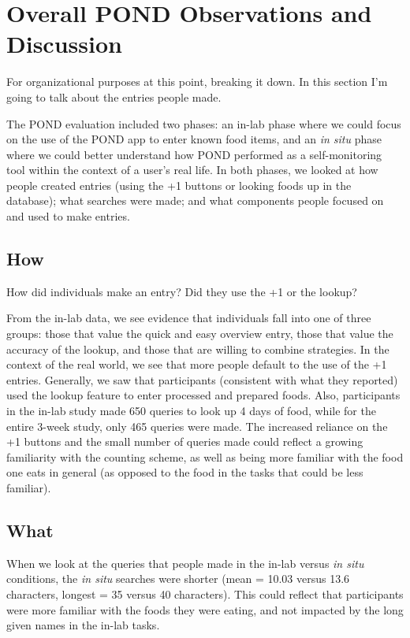 \section{Overall POND Observations and Discussion}
For organizational purposes at this point, breaking it down. In this section I'm going to talk about the entries people made. 

The POND evaluation included two phases: an in-lab phase where we could focus on the use of the POND app to enter known food items, and an \textit{in situ} phase where we could better understand how POND performed as a self-monitoring tool within the context of a user's real life. In both phases, we looked at how people created entries (using the +1 buttons or looking foods up in the database); what searches were made; and what components people focused on and used to make entries. 


\subsection{How}

How did individuals make an entry? Did they use the +1 or the lookup?

From the in-lab data, we see evidence that individuals fall into one of three groups: those that value the quick and easy overview entry, those that value the accuracy of the lookup, and those that are willing to combine strategies. In the context of the real world, we see that more people default to the use of the +1 entries. Generally, we saw that participants (consistent with what they reported) used the lookup feature to enter processed and prepared foods. Also, participants in the in-lab study made 650 queries to look up 4 days of food, while for the entire 3-week study, only 465 queries were made. The increased reliance on the +1 buttons and the small number of queries made could reflect a growing familiarity with the counting scheme, as well as being more familiar with the food one eats in general (as opposed to the food in the tasks that could be less familiar). 

\subsection{What}

When we look at the queries that people made in the in-lab versus \textit{in situ} conditions, the \textit{in situ} searches were shorter (mean = 10.03 versus 13.6 characters, longest = 35 versus 40 characters). This could reflect that participants were more familiar with the foods they were eating, and not impacted by the long given names in the in-lab tasks. 

